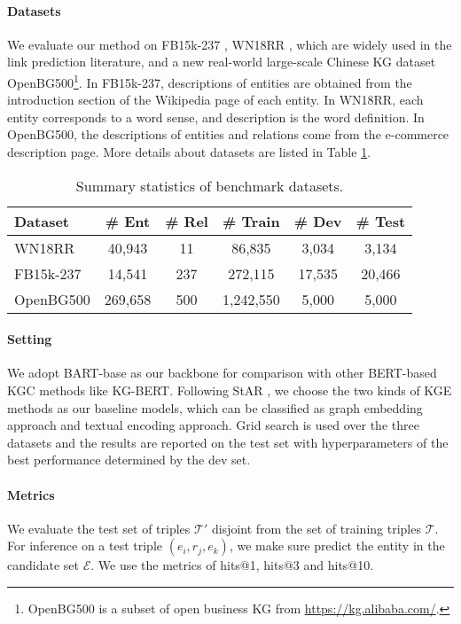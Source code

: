 \documentclass[sigconf]{acmart}
\begin{document}
\paragraph{Datasets}
We evaluate our method on FB15k-237 \cite{fb15k}, WN18RR \cite{wn18rr}, which are widely used in the link prediction literature, and a new real-world large-scale Chinese KG dataset OpenBG500\footnote{OpenBG500 is a subset of open business KG from \url{https://kg.alibaba.com/}.}.
In FB15k-237, descriptions of entities are obtained from the introduction section of the Wikipedia page of each entity. 
In WN18RR, each entity corresponds to a word sense, and description is the word definition. 
In OpenBG500, the descriptions of entities and relations come from the e-commerce description page.
More details about datasets are listed in Table \ref{tb:dataset}.

\begin{table}[!htbp]\small
\caption{\small Summary statistics of benchmark datasets.}
\renewcommand\tabcolsep{4.0pt}
	\centering
	\begin{tabular}{lccccc}
		\toprule
		\textbf{Dataset}   & \textbf{\# Ent}  & \textbf{\# Rel} & \textbf{\# Train} & \textbf{\# Dev} & \textbf{\# Test} \\
		\midrule
		WN18RR    & 40,943  & 11    & 86,835   & 3,034  & 3,134   \\
		FB15k-237 & 14,541  & 237   & 272,115  & 17,535 & 20,466  \\ 
		OpenBG500  & 269,658  & 500   & 1,242,550  & 5,000  & 5,000 \\
		\bottomrule
	\end{tabular}
	\label{tb:dataset}
\end{table} 
\paragraph{Setting}
We adopt BART-base as our backbone for comparison with other BERT-based KGC methods like KG-BERT.
Following StAR \cite{STAR}, we choose the two kinds of KGE methods as our baseline models, which can be classified as graph embedding approach and textual encoding approach.
Grid search is used over the three datasets and the results are reported on the test set with hyperparameters of the best performance determined by the dev set.


\paragraph{Metrics}
We evaluate the test set of triples $\mathcal{T'}$ disjoint from the set of training triples $\mathcal{T}$.
For inference on a test triple $(e_i, r_j, e_k)$, we make sure predict the entity in the candidate set $\mathcal{E}$.
We use the metrics of hits@1, hits@3 and hits@10.
\end{document}
